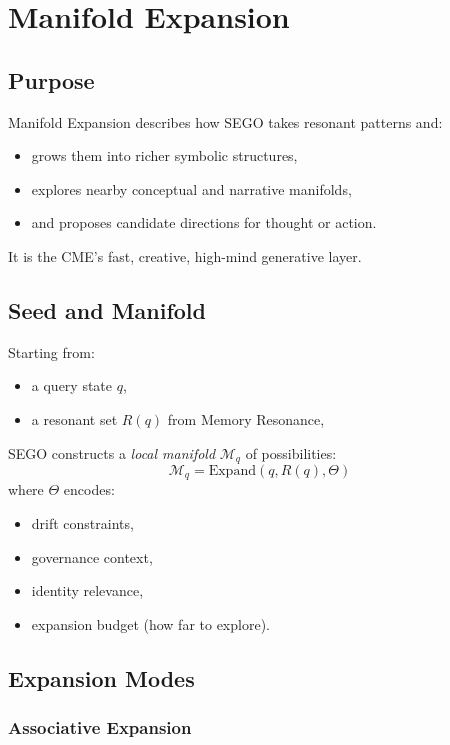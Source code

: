 \chapter{Manifold Expansion}
\label{chap:Manifold_Expansion}

\section{Purpose}

Manifold Expansion describes how SEGO takes resonant patterns and:
\begin{itemize}
    \item grows them into richer symbolic structures,
    \item explores nearby conceptual and narrative manifolds,
    \item and proposes candidate directions for thought or action.
\end{itemize}

It is the CME's fast, creative, high-mind generative layer.

\section{Seed and Manifold}

Starting from:
\begin{itemize}
    \item a query state $q$,
    \item a resonant set $R(q)$ from Memory Resonance,
\end{itemize}
SEGO constructs a \emph{local manifold} $\mathcal{M}_q$ of possibilities:
\[
\mathcal{M}_q = \mathrm{Expand}(q, R(q), \Theta)
\]
where $\Theta$ encodes:
\begin{itemize}
    \item drift constraints,
    \item governance context,
    \item identity relevance,
    \item expansion budget (how far to explore).
\end{itemize}

\section{Expansion Modes}

\subsection{Associative Expansion}


